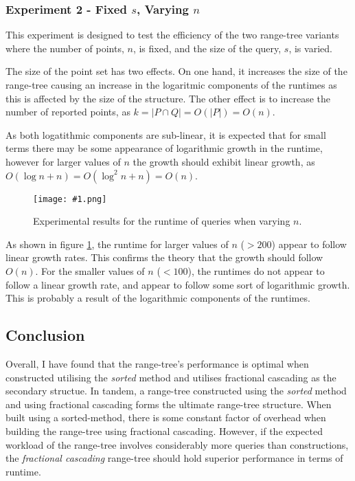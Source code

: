 \documentclass[12pt]{article}
\newcommand{\sorted}{\textit{sorted} }
\newcommand{\fc}{\textit{fractional cascading} }
\newcommand{\fig}[2]{
  \begin{figure}[h]
    \centering
    \texttt{[image: \#1.png]}
    \caption{#2}
    \label{fig:#1}
  \end{figure}
}
\begin{document}
\newpage

\subsubsection*{Experiment 2 - Fixed $s$, Varying $n$}
This experiment is designed to test the efficiency of the two range-tree variants 
where the number of points, $n$, is fixed, and the size of the query, $s$, is varied.

The size of the point set has two effects. On one hand, it increases the size of the range-tree causing an increase in the logaritmic components of the runtimes as this is affected by the size of the structure. The other effect is to increase the number of reported points, as $k = |P \cap Q| = O\left( |P| \right) = O\left( n \right)$. 

As both logatithmic components are sub-linear, it is expected that for small terms there may be some appearance of logarithmic growth in the runtime, however for larger values of $n$ the growth should exhibit linear growth, as $O\left( \log n + n \right) = O\left( \log^2 n + n \right) = O(n)$.

\fig{queryn}{Experimental results for the runtime of queries when varying $n$.}

As shown in figure \ref{fig:queryn}, the runtime for larger values of $n$ ($> 200$) appear to follow linear growth rates. This confirms the theory that the growth should follow $O\left( n \right)$. For the smaller values of $n$ ($< 100$), the runtimes do not appear to follow a linear growth rate, and appear to follow some sort of logarithmic growth. This is probably a result of the logarithmic components of the runtimes.


\subsection*{Conclusion}
Overall, I have found that the range-tree's performance is optimal when constructed utilising the \sorted method and utilises fractional cascading as the secondary structue. In tandem, a range-tree constructed using the \sorted method and using fractional cascading forms the ultimate range-tree structure. When built using a sorted-method, there is some constant factor of overhead when building the range-tree using fractional cascading. However, if the expected workload of the range-tree involves considerably more queries than constructions, the \fc range-tree should hold superior performance in terms of runtime.
\end{document}
